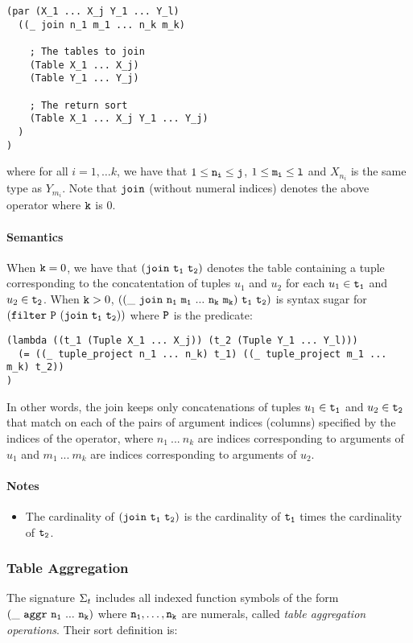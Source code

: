 \documentclass[english,a4paper,10pt]{article}
\begin{document}
\begin{verbatim}
(par (X_1 ... X_j Y_1 ... Y_l)
  ((_ join n_1 m_1 ... n_k m_k)
  
    ; The tables to join
    (Table X_1 ... X_j)
    (Table Y_1 ... Y_j)
    
    ; The return sort
    (Table X_1 ... X_j Y_1 ... Y_j)
  )
)
\end{verbatim}
where for all $i = 1, \ldots k$,
we have that $1 \leq {\tt n_i} \leq {\tt j}$, $1 \leq {\tt m_i} \leq {\tt l}$
and $X_{n_i}$ is the same type as $Y_{m_i}$.
Note that
${\tt join}$ (without numeral indices) denotes the above operator where ${\tt k}$ is $0$.

\paragraph{Semantics}
When ${\tt k}=0$, we have that $\syntax{(join\ t_1\ t_2)}$
denotes the table containing a tuple corresponding to the concatentation
of tuples $u_1$ and $u_2$
for each $u_1 \in {\tt t_1}$ and $u_2 \in {\tt t_2}$.
When ${\tt k}>0$, $\syntax{((\_\ join\ n_1\ m_1\ ...\ n_k\ m_k)\ t_1\ t_2)}$
is syntax sugar for ${\tt (filter\ P\ (join\ t_1\ t_2))}$ where ${\tt P}$ is
the predicate:
\begin{verbatim}
(lambda ((t_1 (Tuple X_1 ... X_j)) (t_2 (Tuple Y_1 ... Y_l)))
  (= ((_ tuple_project n_1 ... n_k) t_1) ((_ tuple_project m_1 ... m_k) t_2))
)
\end{verbatim}
In other words,
the join keeps only concatenations of tuples $u_1 \in {\tt t_1}$ and
$u_2 \in {\tt t_2}$ 
that match on each of the pairs of argument indices (columns) specified by
the indices of the operator,
where $n_1\ ...\ n_k$ are indices corresponding to arguments of $u_1$
and $m_1\ ...\ m_k$ are indices corresponding to arguments of $u_2$.

\paragraph{Notes}
\begin{itemize}
\item The cardinality of $\syntax{(join\ t_1\ t_2)}$
is the cardinality of ${\tt t_1}$ times the cardinality of ${\tt t_2}$.
\end{itemize}


\subsubsection{Table Aggregation}
The signature $\Sigma_{t}$ includes 
all indexed function symbols of the form
$
{\tt  
(\_\ aggr\ n_1\ ...\ n_k)
}
$
where ${\tt n_1}, \ldots, {\tt n_k}$ are numerals,
called \emph{table aggregation operations}. Their sort definition is:
\end{document}
